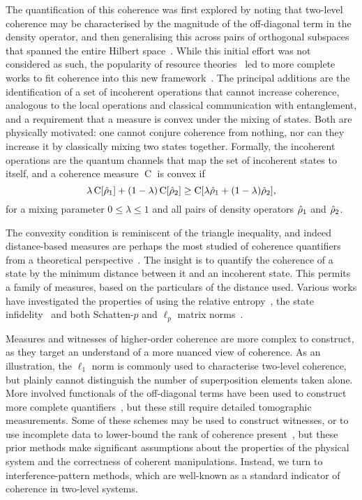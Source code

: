 The quantification of this coherence was first explored by noting that two-level coherence may be characterised by the magnitude of the off-diagonal term in the density operator, and then generalising this across pairs of orthogonal subspaces that spanned the entire Hilbert space~\cite{Aberg2006}.
While this initial effort was not considered as such, the popularity of resource theories~\cite{Chitambar2019} led to more complete works to fit coherence into this new framework~\cite{Levi2014,Baumgratz2014}.
The principal additions are the identification of a set of incoherent operations that cannot increase coherence, analogous to the local operations and classical communication with entanglement, and a requirement that a measure is convex under the mixing of states.
Both are physically motivated: one cannot conjure coherence from nothing, nor can they increase it by classically mixing two states together.
Formally, the incoherent operations are the quantum channels that map the set of incoherent states to itself, and a coherence measure $\operatorname C$ is convex if
\begin{equation}\label{eq:coherence-convexity}
\lambda \operatorname C[\hat{\rho}_1] + (1 - \lambda) \operatorname C[\hat{\rho}_2] \ge \operatorname C[\lambda\hat{\rho}_1 + (1-\lambda)\hat{\rho}_2],
\end{equation}
for a mixing parameter $0\le\lambda\le1$ and all pairs of density operators $\hat{\rho}_1$ and $\hat{\rho}_2$.

The convexity condition is reminiscent of the triangle inequality, and indeed distance-based measures are perhaps the most studied of coherence quantifiers from a theoretical perspective~\cite{Streltsov2017}.
The insight is to quantify the coherence of a state by the minimum distance between it and an incoherent state.
This permits a family of measures, based on the particulars of the distance used.
Various works have investigated the properties of using the relative entropy~\cite{Baumgratz2014,Winter2016}, the state infidelity~\cite{Streltsov2015} and both Schatten-$p$ and $\ell_p$ matrix norms~\cite{Baumgratz2014,Rana2016}.

Measures and witnesses of higher-order coherence are more complex to construct, as they target an understand of a more nuanced view of coherence.
As an illustration, the $\ell_1$ norm is commonly used to characterise two-level coherence, but plainly cannot distinguish the number of superposition elements taken alone.
More involved functionals of the off-diagonal terms have been used to construct more complete quantifiers~\cite{Levi2014,Ringbauer2018}, but these still require detailed tomographic measurements.
Some of these schemes may be used to construct witnesses, or to use incomplete data to lower-bound the rank of coherence present~\cite{Ringbauer2018}, but these prior methods make significant assumptions about the properties of the physical system and the correctness of coherent manipulations.
Instead, we turn to interference-pattern methods, which are well-known as a standard indicator of coherence in two-level systems.


